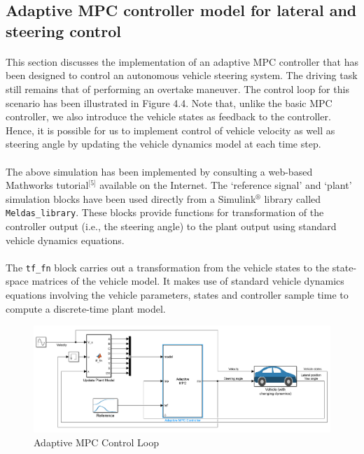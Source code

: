 \subsection{Adaptive MPC controller model for lateral and steering control}
\paragraph{}
This section discusses the implementation of an adaptive MPC controller that has been designed to control an autonomous vehicle steering system. The driving task still remains that of performing an overtake maneuver. The control loop for this scenario has been illustrated in Figure 4.4. Note that, unlike the basic MPC controller, we also introduce the vehicle states as feedback to the controller. Hence, it is possible for us to implement control of vehicle velocity as well as steering angle by updating the vehicle dynamics model at each time step.

\paragraph{}
The above simulation has been implemented by consulting a web-based Mathworks tutorial$^{\text{[5]}}$ available on the Internet. The `reference signal' and `plant' simulation blocks have been used directly from a Simulink$^{\circledR}$ library called \texttt{Meldas\_library}. These blocks provide functions for transformation of the controller output (i.e., the steering angle) to the plant output using standard vehicle dynamics equations.

\paragraph{}
The \texttt{tf\_fn} block carries out a transformation from the vehicle states to the state-space matrices of the vehicle model. It makes use of standard vehicle dynamics equations involving the vehicle parameters, states and controller sample time to compute a discrete-time plant model.

\begin{figure}[H]\label{fig4.4}
\centering \includegraphics[width=\textwidth]{Images/adaptive_mpc_model.png}
\caption{Adaptive MPC Control Loop}
\end{figure}

